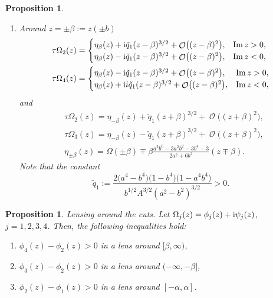 \documentclass[10pt,a4paper]{amsart}
\DeclareMathOperator{\OO}{\mathcal{O}}
\numberwithin{equation}{section}
\newtheorem{Proposition}[Theorem]{Proposition}
 { \theoremstyle{definition}
\newtheorem{Definition}[Theorem]{Definition}
\newtheorem{Note}[Theorem]{Note}
\newtheorem{Example}[Theorem]{Example}
\newtheorem{Remark}[Theorem]{Remark} }
\begin{document}
\begin{Proposition}
\begin{enumerate}
 \item[$(2)$] \textit{Around $z = \pm\beta := z(\pm b)$}
 \begin{align*}
 &\tau\Omega_2(z)=
 \begin{cases}
 \eta_{\beta}(z) + {\rm i}\tilde{q}_1 (z -\beta)^{3/2} + \OO\bigl( (z-\beta)^2 \bigr), & \operatorname{Im} z > 0,\\
 \eta_{\beta}(z) - {\rm i}\tilde{q}_1(z -\beta)^{3/2} + \OO\bigl( (z-\beta)^2 \bigr),& \operatorname{Im} z < 0,\\
 \end{cases}\\
 &\tau\Omega_4(z)=
 \begin{cases}
 \eta_{\beta}(z) - {\rm i}\tilde{q}_1 (z -\beta)^{3/2} + \OO\bigl( (z-\beta)^2 \bigr), & \operatorname{Im} z > 0,\\
 \eta_{\beta}(z) + {\rm i}i\tilde{q}_1 (z -\beta)^{3/2} + \OO\bigl( (z-\beta)^2 \bigr),& \operatorname{Im} z < 0,\\
 \end{cases}
 \end{align*}
 and
 \begin{align*}
 &\tau\Omega_2(z)= \eta_{-\beta}(z) + \tilde{q}_1 (z +\beta)^{3/2} + \OO\bigl( (z+\beta)^2 \bigr),\\
 &\tau\Omega_3(z)= \eta_{-\beta}(z) - \tilde{q}_1 (z +\beta)^{3/2} + \OO\bigl( (z+\beta)^2 \bigr),\\
& \eta_{ \pm \beta}(z) = \Omega(\pm \beta) \mp \beta \frac{a^2b^6 - 3a^2b^2 - 3b^4 - 3}{2a^2 + 6b^2} (z\mp \beta).
 \end{align*}
Note that the constant
 \[
 \tilde{q}_1 := \frac{2 \bigl(a^4-b^4\bigr)\bigl(1-b^4\bigr)\bigl(1-a^4b^4\bigr)}{b^{1/2}A^{3/2} (a^2-b^2)^{3/2}} >0.
 \]
 \end{enumerate}
\end{Proposition}


 \begin{Proposition}\label{lensing-generic}
 \textit{Lensing around the cuts.}
 Let $\Omega_j(z) = \phi_j(z) + {\rm i}\psi_j(z)$, $j= 1,2,3,4$. Then, the following inequalities hold:
 \begin{enumerate}\itemsep=0pt
 \item[$(1)$] $\phi_4(z) - \phi_2(z) > 0$ in a lens around $[\beta,\infty)$,
 \item[$(2)$] $\phi_3(z) - \phi_2(z) > 0$ in a lens around $(-\infty,-\beta]$,
 \item[$(3)$] $\phi_2(z) - \phi_1(z) > 0$ in a lens around $[-\alpha,\alpha]$.
 \end{enumerate}
 \end{Proposition}
\end{document}
